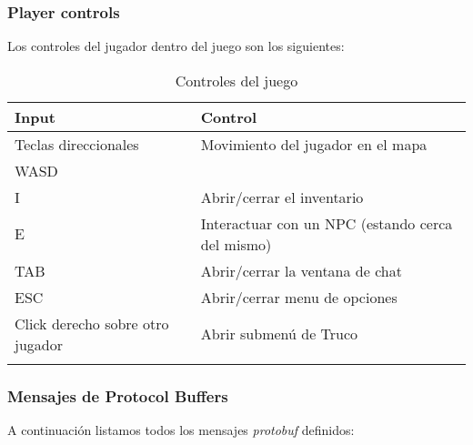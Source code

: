 
\subsubsection{Player controls}
Los controles del jugador dentro del juego son los siguientes:
\begin{longtable}{|l|l|}
    \hline
    \textbf{Input} & \textbf{Control}\\
    \hline
    Teclas direccionales & Movimiento del jugador en el mapa \\
    WASD                 &  \\
    \hline
    I                    & Abrir/cerrar el inventario \\
    \hline
    E                    & Interactuar con un NPC (estando cerca del mismo) \\
    \hline
    TAB                  & Abrir/cerrar la ventana de chat \\
    \hline
    ESC                    & Abrir/cerrar menu de opciones \\
    \hline
    Click derecho sobre otro jugador & Abrir submenú de Truco \\
    \hline
    \caption{Controles del juego}\\
\end{longtable}

\subsubsection{Mensajes de Protocol Buffers}

A continuación listamos todos los mensajes \textit{protobuf} definidos:


